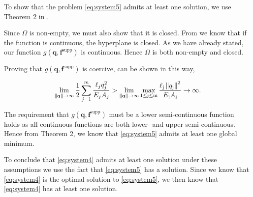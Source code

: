 To show that the problem \eqref{eq:system5} admits at least one solution, we use Theorem 2 in \cite{optThe}.

Since $\Omega$ is non-empty, we must also show that it is closed. From \cite{hyper} we know that if the function is continuous, the hyperplane is closed. As we have already stated, our function $g(\bm{q},\bm{f}^{\textrm{supp}})$ is continuous. Hence $\Omega$ is both non-empty and closed.

Proving that $g(\bm{q},\bm{f}^{\textrm{supp}})$ is coercive, can be shown in this way,

\begin{equation}
\lim_{\left\|\bm{q}\right\|\to\infty} \frac{1}{2}\sum_{j=1}^{m}\frac{\ell_{j}q_{j}^{2}}{E_{j}A_{j}} > 
\lim_{\left\|\bm{q}\right\|\to\infty} \max_{1 \leq \textrm{j} \leq \textrm{m}} \frac{\ell_{\textrm{j}}\left\|{q_{\textrm{j}}}\right\|^{2}}{E_{\textrm{j}}A_{\textrm{j}}} \rightarrow \infty.
\end{equation}

The requirement that $g(\bm{q},\bm{f}^{\textrm{supp}})$ must be a lower semi-continuous function holds as all continuous functions are both lower- and upper semi-continuous. Hence from Theorem 2, we know that \eqref{eq:system5} admits at least one global minimum.

To conclude that \eqref{eq:system4} admits at least one solution under these assumptions we use the fact that \eqref{eq:system5} has a solution. Since we know that \eqref{eq:system4} is the optimal solution to \eqref{eq:system5}, we then know that \eqref{eq:system4} has at least one solution.